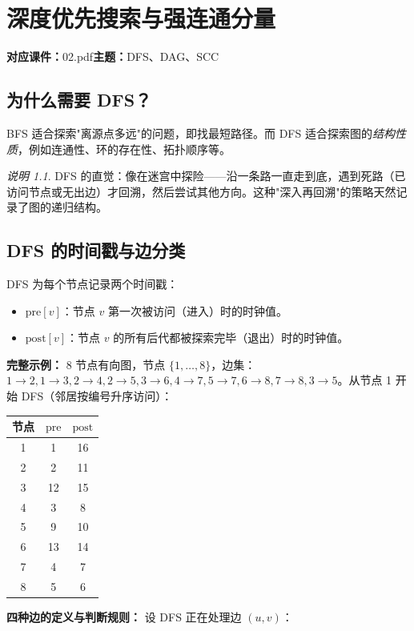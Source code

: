 \documentclass[UTF8,openany,12pt]{ctexbook}
\theoremstyle{remark}
\newtheorem{remark}{说明}[chapter]
\newcommand{\lecture}[3]{
  \chapter{#2}
  \noindent\textbf{对应课件：}#1\hfill\textbf{主题：}#3
  \vspace{0.6em}
}
\begin{document}
\lecture{02.pdf}{深度优先搜索与强连通分量}{DFS、DAG、SCC}

\section{为什么需要 DFS？}

BFS 适合探索"离源点多远"的问题，即找最短路径。而 DFS 适合探索图的\emph{结构性质}，例如连通性、环的存在性、拓扑顺序等。

\begin{remark}
DFS 的直觉：像在迷宫中探险——沿一条路一直走到底，遇到死路（已访问节点或无出边）才回溯，然后尝试其他方向。这种"深入再回溯"的策略天然记录了图的递归结构。
\end{remark}

\section{DFS 的时间戳与边分类}

DFS 为每个节点记录两个时间戳：
\begin{itemize}
  \item $\mathrm{pre}[v]$：节点 $v$ 第一次被访问（进入）时的时钟值。
  \item $\mathrm{post}[v]$：节点 $v$ 的所有后代都被探索完毕（退出）时的时钟值。
\end{itemize}

\textbf{完整示例：} 8 节点有向图，节点 $\{1,\ldots,8\}$，边集：$1\to2, 1\to3, 2\to4, 2\to5, 3\to6, 4\to7, 5\to7, 6\to8, 7\to8, 3\to5$。从节点 1 开始 DFS（邻居按编号升序访问）：

\begin{center}
\begin{tabular}{@{}ccc@{}}
\toprule
节点 & $\mathrm{pre}$ & $\mathrm{post}$ \\
\midrule
1 & 1  & 16 \\
2 & 2  & 11 \\
3 & 12 & 15 \\
4 & 3  & 8  \\
5 & 9  & 10 \\
6 & 13 & 14 \\
7 & 4  & 7  \\
8 & 5  & 6  \\
\bottomrule
\end{tabular}
\end{center}

\textbf{四种边的定义与判断规则：} 设 DFS 正在处理边 $(u, v)$：
\end{document}
